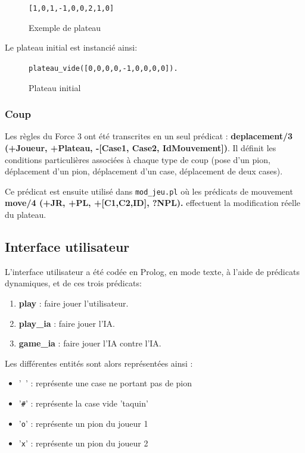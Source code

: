 \documentclass[a4paper,12pt]{article}
\newcommand{\code}[1]{\texttt{#1}}
\begin{document}
  \begin{figure}[h]
    \code{[1,0,1,-1,0,0,2,1,0]}
    \centering
    \caption{Exemple de plateau}
  \end{figure}
  
Le plateau initial est instancié ainsi:\\
  \begin{figure}[h]
\code{plateau\_vide([0,0,0,0,-1,0,0,0,0]).}
    \centering
    \caption{Plateau initial}
  \end{figure}

\subsubsection{Coup}
Les règles du Force 3 ont été transcrites en un seul prédicat : \textbf{deplacement/3 (+Joueur, +Plateau, -[Case1, Case2, IdMouvement])}. Il définit les conditions particulières associées à chaque type de coup (pose d'un pion, déplacement d'un pion, déplacement d'un case, déplacement de deux cases).

Ce prédicat est ensuite utilisé dans \texttt{mod\_jeu.pl} où les prédicats de mouvement \textbf{move/4 (+JR, +PL, +[C1,C2,ID], ?NPL).} effectuent la modification réelle du plateau.

\subsection{Interface utilisateur}
    L'interface utilisateur a été codée en Prolog, en mode texte, à l'aide de prédicats dynamiques, et de
    ces trois prédicats:

  \begin{enumerate}
    \item \textbf{play} : faire jouer l'utilisateur.
    \item \textbf{play\_ia} : faire jouer l'IA.
    \item \textbf{game\_ia} : faire jouer l'IA contre l'IA.
  \end{enumerate}
  Les diff\'erentes entit\'es sont alors repr\'esent\'ees ainsi :

  \begin{itemize}
    \item{'\texttt{ }' : repr\'esente une case ne portant pas de pion}
    \item{'\texttt{\#}' : repr\'esente la case vide 'taquin'}
    \item{'\texttt{o}' : repr\'esente un pion du joueur 1}
    \item{'\texttt{x}' : repr\'esente un pion du joueur 2}
  \end{itemize}
\end{document}
